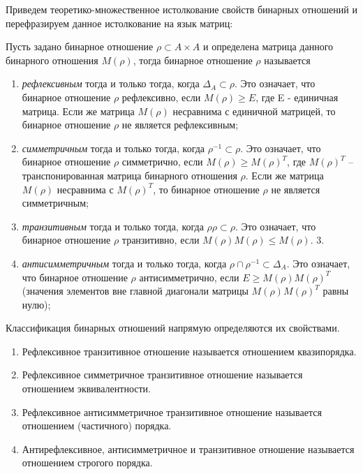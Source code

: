 \documentclass[spec, och, labwork]{shiza}
\begin{document}
        Приведем теоретико-множественное истолкование свойств бинарных отношений и перефразируем данное истолкование на язык матриц:
        
        Пусть задано бинарное отношение $\rho \subset A \times A$ и определена матрица данного бинарного отношения $M(\rho)$, тогда бинарное отношение $\rho$ называется

        \begin{enumerate}
            \item \textit{рефлексивным} тогда и только тогда, когда $\Delta_A \subset \rho$. Это означает, что бинарное
            отношение $\rho$ рефлексивно, если $M(\rho) \geq E$, где E - единичная матрица. Если же матрица $M(\rho)$ 
            несравнима с единичной матрицей, то бинарное отношение $\rho$ не является рефлексивным;
            \item \textit{симметричным} тогда и только тогда, когда $\rho^{-1} \subset \rho$. Это означает, что бинарное 
            отношение $\rho$ симметрично, если $M(\rho) \geq M(\rho)^T$, где $M(\rho)^T$ – транспонированная матрица 
            бинарного отношения $\rho$. Если же матрица $M(\rho)$ несравнима с $M(\rho)^T$, то бинарное отношение $\rho$
            не является симметричным;
            \item \textit{транзитивным} тогда и только тогда, когда $\rho \rho \subset \rho$. Это означает, что бинарное
            отношение $\rho$ транзитивно, если $M(\rho)M(\rho) \leq M(\rho)$.
            3. \item \textit{антисимметричным} тогда и только тогда, когда $\rho \cap \rho^{-1} \subset \Delta_A$. Это означает, что бинарное отношение $\rho$ 
            антисимметрично, если $E \geq M(\rho) M(\rho)^T$ (значения элементов вне главной диагонали матрицы $M(\rho) M(\rho)^T$ равны нулю);
        \end{enumerate}

        Классификация бинарных отношений напрямую определяются их свойствами.

        \begin{enumerate}
            \item Рефлексивное транзитивное отношение называется отношением квазипорядка.
            \item Рефлексивное симметричное транзитивное отношение называется отношением эквивалентности.
            \item Рефлексивное антисимметричное транзитивное отношение называется отношением (частичного) порядка.
            \item Антирефлексивное, антисимметричное и транзитивное отношение называется отношением строгого порядка.
        \end{enumerate}
\end{document}
